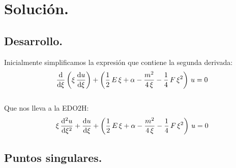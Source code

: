 \section{Solución.}
\subsection{Desarrollo.}

Inicialmente simplificamos la expresión que contiene la segunda derivada:
\begin{align*}
\dv{\xi} \left( \xi\, \dv{u}{\xi} \right) + \left( \dfrac{1}{2} \, E \, \xi + \alpha - \dfrac{m^{2}}{4 \, \xi} - \dfrac{1}{4} \, F \, \xi^{2} \right) \, u = 0
\end{align*}
\\
Que nos lleva a la EDO2H:
\begin{align*}
\xi \, \dv[2]{u}{\xi} + \dv{u}{\xi} + \left( \dfrac{1}{2} \, E \, \xi + \alpha - \dfrac{m^{2}}{4 \, \xi} - \dfrac{1}{4} \, F \, \xi^{2} \right) \, u = 0
\end{align*}

\subsection{Puntos singulares.}

